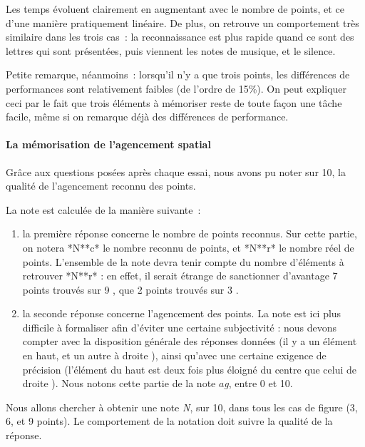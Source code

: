 \documentclass[
]{book}
\providecommand{\tightlist}{%
  \setlength{\itemsep}{0pt}\setlength{\parskip}{0pt}}
\begin{document}
Les temps évoluent clairement en augmentant avec le nombre de points, et
ce d'une manière pratiquement linéaire. De plus, on retrouve un comportement
très similaire dans les trois cas~: la reconnaissance est plus rapide quand
ce sont des lettres qui sont présentées, puis viennent les notes de musique,
et le silence.

Petite remarque, néanmoins~: lorsqu'il n'y a que trois points, les
différences de performances sont relativement faibles (de l'ordre de 15\%). On
peut expliquer ceci par le fait que trois éléments à mémoriser reste de toute
façon une tâche facile, même si on remarque déjà des différences de
performance.

\hypertarget{la-muxe9morisation-de-lagencement-spatial}{%
\paragraph{La mémorisation de l'agencement spatial}\label{la-muxe9morisation-de-lagencement-spatial}}

Grâce aux questions posées après chaque essai, nous avons pu noter sur 10,
la qualité de l'agencement reconnu des points.

La note est calculée de la manière suivante~:

\begin{enumerate}
\def\labelenumi{\arabic{enumi}.}
\tightlist
\item
  la première réponse concerne le nombre de points
  reconnus. Sur cette partie, on notera *N**c* le nombre reconnu
  de points, et *N**r* le nombre réel de points. L'ensemble de la note
  devra tenir compte du nombre d'éléments à retrouver *N**r* : en effet, il
  serait étrange de sanctionner d'avantage 7 points trouvés sur 9 , que 2
  points trouvés sur 3 .
\item
  la seconde réponse concerne l'agencement des
  points. La note est ici plus difficile à formaliser afin d'éviter une
  certaine subjectivité : nous devons compter avec la disposition générale
  des réponses données (il y a un élément en haut, et un autre à droite ),
  ainsi qu'avec une certaine exigence de précision (l'élément du haut est
  deux fois plus éloigné du centre que celui de droite ). Nous notons cette
  partie de la note \(a\)\emph{g}, entre 0 et 10.
\end{enumerate}

Nous allons chercher à obtenir une note \emph{N}, sur
10, dans tous les cas de figure (3, 6, et 9 points). Le comportement de la
notation doit suivre la qualité de la réponse.
\end{document}
